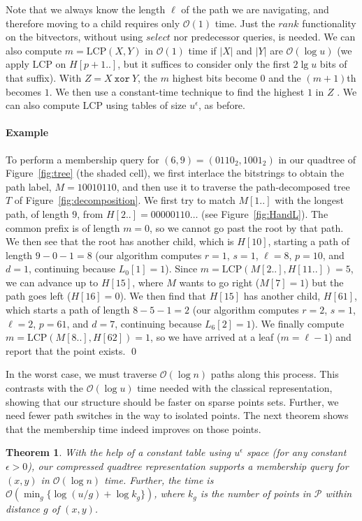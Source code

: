 \documentclass{elsarticle}
\newtheorem{theorem}{Theorem}
\newcommand{\Oh}[1]
  {\ensuremath{\mathcal{O}\!\left( {#1} \right)}}
\newcommand{\LCP}{\ensuremath{\mathrm{LCP}}}
\newenvironment{example}{\paragraph{Example}}{\qed \medskip }
\begin{document}
Note that we always know the length $\ell$ of the path we are navigating, and therefore moving to a child requires only $\Oh{1}$ time. Just the $rank$ functionality on the bitvectors, without using $select$ nor predecessor queries, is needed. We can also compute $m=\LCP(X,Y)$ in $\Oh{1}$ time if $|X|$ and $|Y|$ are $\Oh{\log u}$ (we apply $\LCP$ on $H[p+1..]$, but it suffices to consider only the first $2\lg u$ bits of that suffix). With $Z = X~\texttt{xor}~Y$, the $m$ highest bits become $0$ and the $(m+1)$th becomes $1$. We then use a constant-time technique to find the highest $1$ in $Z$ \cite{Knu09}. We can also compute $\LCP$ using tables of size $u^\epsilon$, as before.



\begin{example}
To perform a membership query for \((6, 9) = (0110_2,1001_2)\) in our quadtree of Figure~\ref{fig:tree} (the shaded cell), we first interlace the bitstrings to obtain the path label, $M = 10010110$, and then use it to traverse the path-decomposed tree $T$ of Figure~\ref{fig:decomposition}. We first try to match $M[1..]$ with the longest path, of length $9$, from $H[2..]=00000110\ldots$ (see Figure~\ref{fig:HandL}). The common prefix is of length $m=0$, so we cannot go past the root by that path. We then see that the root has another child, which is $H[10]$, starting a path of length $9-0-1=8$ (our algorithm computes $r=1$, $s=1$, $\ell=8$, $p=10$, and $d=1$, continuing because $L_0[1]=1$). Since $m=\LCP(M[2..],H[11..])=5$, we can advance up to $H[15]$, where $M$ wants to go right ($M[7]=1$) but the path goes left ($H[16]=0$). We then find that $H[15]$ has another child, $H[61]$, which starts a path of length $8-5-1=2$ (our algorithm computes $r=2$, $s=1$, $\ell=2$, $p=61$, and $d=7$, continuing because $L_6[2]=1$). We finally compute $m=\LCP(M[8..],H[62])=1$, so we have arrived at a leaf ($m=\ell-1$) and report that the point exists.
\end{example}

In the worst case, we must traverse $\Oh{\log n}$ paths along this process. This contrasts with the $\Oh{\log u}$ time needed with the classical representation, showing that our structure should be faster on sparse points sets. Further, we need fewer path switches in the way to isolated points. The next theorem shows that the membership time indeed improves on those points.

\begin{theorem}
\label{thm:membership}
With the help of a constant table using $u^\epsilon$ space (for any constant 
$\epsilon>0$), our compressed quadtree representation supports a membership 
query for \((x, y)\) in $\Oh{\log n}$ time. Further, the time is \(\Oh{\min_g \{\log (u / g) + \log k_g\}}\), where $k_g$ is the number of points in $\mathcal{P}$ within distance $g$ of \((x, y)\).
\end{theorem}
\end{document}
